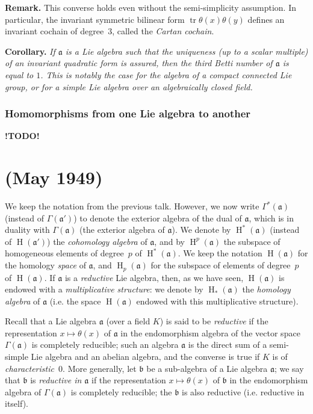 \documentclass{article}
\newcommand{\fk}{\mathfrak}
\DeclareMathOperator{\HH}{H}
\DeclareMathOperator{\tr}{tr}
\newcommand{\todo}{\textbf{ !TODO! }}
\begin{document}
\medskip
\textbf{Remark.}
This converse holds even without the semi-simplicity assumption.
In particular, the invariant symmetric bilinear form $\tr\theta(x)\theta(y)$ defines an invariant cochain of degree~$3$, called the \emph{Cartan cochain}.

\medskip
\textbf{Corollary.}
{\itshape
  If $\fk{a}$ is a Lie algebra such that the \emph{uniqueness} (up to a scalar multiple) of an invariant quadratic form is assured, then the third Betti number of $\fk{a}$ is equal to $1$.
  This is notably the case for the algebra of a compact connected Lie group, or for a simple Lie algebra over an algebraically closed field.
}

\section{Homomorphisms from one Lie algebra to another}
\label{II.6}

\todo



\part{(May 1949)}
\label{III}

We keep the notation from the previous talk.
However, we now write $\Gamma^*(\fk{a})$ (instead of $\Gamma(\fk{a}')$) to denote the exterior algebra of the dual of $\fk{a}$, which is in duality with $\Gamma(\fk{a})$ (the exterior algebra of $\fk{a}$).
We denote by $\HH^*(\fk{a})$ (instead of $\HH(\fk{a}')$) the \emph{cohomology algebra} of $\fk{a}$, and by $\HH^p(\fk{a})$ the subspace of homogeneous elements of degree~$p$ of $\HH^*(\fk{a})$.
We keep the notation $\HH(\fk{a})$ for the homology \emph{space} of $\fk{a}$, and $\HH_p(\fk{a})$ for the subspace of elements of degree~$p$ of $\HH(\fk{a})$.
If $\fk{a}$ is a \emph{reductive} Lie algebra, then, as we have seen, $\HH(\fk{a})$ is endowed with a \emph{multiplicative structure}:
we denote by $\HH_*(\fk{a})$ the \emph{homology algebra} of $\fk{a}$ (i.e. the space $\HH(\fk{a})$ endowed with this multiplicative structure).

Recall that a Lie algebra $\fk{a}$ (over a field $K$) is said to be \emph{reductive} if the representation $x\mapsto\theta(x)$ of $\fk{a}$ in the endomorphism algebra of the vector space $\Gamma(\fk{a})$ is completely reducible;
such an algebra $\fk{a}$ is the direct sum of a semi-simple Lie algebra and an abelian algebra, and the converse is true if $K$ is of \emph{characteristic~$0$}.
More generally, let $\fk{b}$ be a sub-algebra of a Lie algebra $\fk{a}$;
we say that $\fk{b}$ is \emph{reductive in $\fk{a}$} if the representation $x\mapsto\theta(x)$ of $\fk{b}$ in the endomorphism algebra of $\Gamma(\fk{a})$ is completely reducible;
the $\fk{b}$ is also reductive (i.e. reductive in itself).
\end{document}
